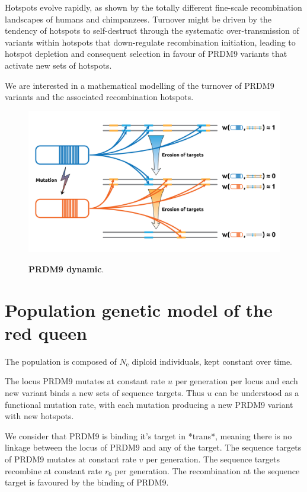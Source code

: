 \documentclass{article}
\begin{document}
Hotspots evolve rapidly, as shown by the totally different fine-scale recombination landscapes of humans and chimpanzees.
Turnover might be driven by the tendency of hotspots to self-destruct through the systematic over-transmission of variants within hotspots that down-regulate recombination initiation, leading to hotspot depletion and consequent 
selection in favour of PRDM9 variants that activate new sets of hotspots.

We are interested in a mathematical modelling of the turnover of PRDM9 variants and the associated recombination hotspots.

	\begin{figure}[H]
	  \centering
       \includegraphics[width=12.0cm]{Images/RedQueen.png}\\
		\caption{ \textbf{PRDM9 dynamic}. 
		\label{fig:redqueen}}
	\end{figure}
	
\section{Population genetic model of the red queen}


The population is composed of $N_\mathrm{e}$ diploid individuals, kept constant over time.


The locus PRDM9 mutates at constant rate $u$ per generation per locus and each new variant binds a new sets of sequence targets. Thus $u$ can be understood as a functional mutation rate, with each mutation producing a new PRDM9 variant with new hotspots.


We consider that PRDM9 is binding it's target in *trans*, meaning there is no linkage between the locus of PRDM9 and any of the target. The sequence targets of PRDM9 mutates at constant rate $v$ per generation. The sequence targets recombine at constant rate $r_0$ per generation. The recombination at the sequence target is favoured by the binding of PRDM9.
\end{document}
